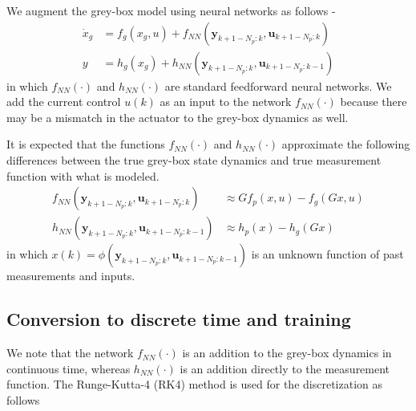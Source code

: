 \documentclass{article}
\begin{document}
We augment the grey-box model using 
neural networks as follows -
\begin{align*}
\dot x_g &= f_g(x_g, u) + 
f_{NN}(\mathbf{y}_{k+1-N_p:k}, \mathbf{u}_{k+1-N_p:k})\\
y &= h_g(x_g) + h_{NN}(\mathbf{y}_{k+1-N_p:k}, \mathbf{u}_{k+1-N_p:k-1})
\end{align*}
in which $f_{NN}(\cdot)$ and $h_{NN}(\cdot)$
are standard feedforward neural networks. We add the current 
control $u(k)$ as an input to the network $f_{NN}(\cdot)$ because 
there may be a mismatch in the actuator to the grey-box dynamics
as well.

It is expected that the functions $f_{NN}(\cdot)$ 
and $h_{NN}(\cdot)$ approximate
the following differences between the true grey-box state dynamics
and true measurement function with what is modeled.
\begin{align*}
  f_{NN}(\mathbf{y}_{k+1-N_p:k}, \mathbf{u}_{k+1-N_p:k}) &\approx 
      Gf_p(x, u) - f_g(Gx, u) \\
      h_{NN}(\mathbf{y}_{k+1-N_p:k}, \mathbf{u}_{k+1-N_p:k-1}) &\approx
      h_p(x) - h_g(Gx) 
\end{align*}  
in which $x(k) = \phi(\mathbf{y}_{k+1-N_p:k}, \mathbf{u}_{k+1-N_p:k-1})$
is an unknown function of past measurements and inputs.

\subsection{Conversion to discrete time and training}
We note that the network $f_{NN}(\cdot)$ is an addition 
to the grey-box dynamics in continuous time, whereas 
$h_{NN}(\cdot)$ is an addition directly to the 
measurement function. The Runge-Kutta-4 (RK4) method 
is used for the discretization as follows
\end{document}
